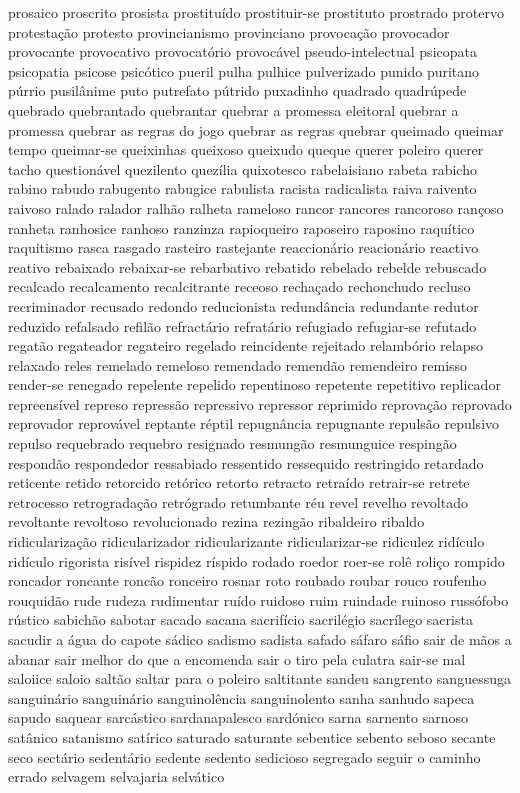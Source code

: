 prosaico proscrito prosista prostitu\'{i}do prostituir-se prostituto prostrado protervo protesta\c{c}\~ao protesto provincianismo provinciano provoca\c{c}\~ao provocador provocante provocativo provocat\'{o}rio provoc\'{a}vel pseudo-intelectual psicopata psicopatia psicose psic\'{o}tico pueril pulha pulhice pulverizado punido puritano p\'{u}rrio pusil\^{a}nime puto putrefato p\'{u}trido puxadinho quadrado quadr\'{u}pede quebrado quebrantado quebrantar quebrar a promessa eleitoral quebrar a promessa quebrar as regras do jogo quebrar as regras quebrar queimado queimar tempo queimar-se queixinhas queixoso queixudo queque querer poleiro querer tacho question\'{a}vel quezilento quez\'{i}lia quixotesco rabelaisiano rabeta rabicho rabino rabudo rabugento rabugice rabulista racista radicalista raiva raivento raivoso ralado ralador ralh\~ao ralheta rameloso rancor rancores rancoroso ran\c{c}oso ranheta ranhosice ranhoso ranzinza rapioqueiro raposeiro raposino raqu\'{i}tico raquitismo rasca rasgado rasteiro rastejante reaccion\'{a}rio reacion\'{a}rio reactivo reativo rebaixado rebaixar-se rebarbativo rebatido rebelado rebelde rebuscado recalcado recalcamento recalcitrante receoso recha\c{c}ado rechonchudo recluso recriminador recusado redondo reducionista redund\^{a}ncia redundante redutor reduzido refalsado refil\~ao refract\'{a}rio refrat\'{a}rio refugiado refugiar-se refutado regat\~ao regateador regateiro regelado reincidente rejeitado relamb\'{o}rio relapso relaxado reles remelado remeloso remendado remend\~ao remendeiro remisso render-se renegado repelente repelido repentinoso repetente repetitivo replicador repreens\'{i}vel represo repress\~ao repressivo repressor reprimido reprova\c{c}\~ao reprovado reprovador reprov\'{a}vel reptante r\'{e}ptil repugn\^{a}ncia repugnante repuls\~ao repulsivo repulso requebrado requebro resignado resmung\~ao resmunguice resping\~ao respond\~ao respondedor ressabiado ressentido ressequido restringido retardado reticente retido retorcido ret\'{o}rico retorto retracto retra\'{i}do retrair-se retrete retrocesso retrograda\c{c}\~ao retr\'{o}grado retumbante r\'{e}u revel revelho revoltado revoltante revoltoso revolucionado rezina rezing\~ao ribaldeiro ribaldo ridiculariza\c{c}\~ao ridicularizador ridicularizante ridicularizar-se ridiculez rid\'{i}culo rid\'{i}culo rigorista ris\'{i}vel rispidez r\'{i}spido rodado roedor roer-se rol\^{e} roli\c{c}o rompido roncador roncante ronc\~ao ronceiro rosnar roto roubado roubar rouco roufenho rouquid\~ao rude rudeza rudimentar ru\'{i}do ruidoso ruim ruindade ruinoso russ\'{o}fobo r\'{u}stico sabich\~ao sabotar sacado sacana sacrif\'{i}cio sacril\'{e}gio sacr\'{i}lego sacrista sacudir a \'{a}gua do capote s\'{a}dico sadismo sadista safado s\'{a}faro s\'{a}fio sair de m\~aos a abanar sair melhor do que a encomenda sair o tiro pela culatra sair-se mal saloiice saloio salt\~ao saltar para o poleiro saltitante sandeu sangrento sanguessuga sanguin\'{a}rio sanguin\'{a}rio sanguinol\^{e}ncia sanguinolento sanha sanhudo sapeca sapudo saquear sarc\'{a}stico sardanapalesco sard\'{o}nico sarna sarnento sarnoso sat\^{a}nico satanismo sat\'{i}rico saturado saturante sebentice sebento seboso secante seco sect\'{a}rio sedent\'{a}rio sedente sedento sedicioso segregado seguir o caminho errado selvagem selvajaria selv\'{a}tico 